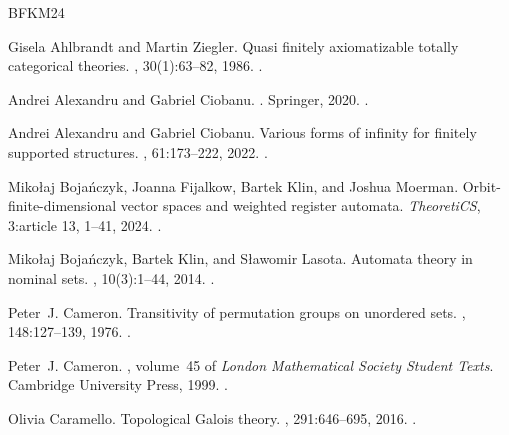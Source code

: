 \documentclass{lmcs}
\begin{document}
\begin{thebibliography}{BFKM24}

Gisela Ahlbrandt and Martin Ziegler.
\newblock Quasi finitely axiomatizable totally categorical theories.
, 30(1):63--82, 1986.
\newblock \href {https://doi.org/10.1016/0168-0072(86)90037-0}
  {}.

Andrei Alexandru and Gabriel Ciobanu.
.
\newblock Springer, 2020.
\newblock \href {https://doi.org/10.1007/978-3-030-52962-8}
  {}.

Andrei Alexandru and Gabriel Ciobanu.
\newblock Various forms of infinity for finitely supported structures.
, 61:173--222, 2022.
\newblock \href {https://doi.org/10.1007/s00153-021-00787-2}
  {}.

Miko{\l}aj Boja\'nczyk, Joanna Fijalkow, Bartek Klin, and Joshua Moerman. Orbit-finite-dimensional vector spaces and weighted register
 automata. {\em TheoretiCS}, 3:article 13, 1--41, 2024.
\newblock \href {https://doi.org/10.46298/theoretics.24.13}
  {}.

Miko{\l}aj Boja\'nczyk, Bartek Klin, and S{\l}awomir Lasota.
\newblock Automata theory in nominal sets.
, 10(3):1--44, 2014.
\newblock \href {https://doi.org/10.2168/LMCS-10(3:4)2014}
  {}.

Peter~J. Cameron.
\newblock Transitivity of permutation groups on unordered sets.
, 148:127--139, 1976.
\newblock \href {https://doi.org/10.1007/BF01214702}
  {}.

Peter~J. Cameron.
, volume~45 of {\em London Mathematical
  Society Student Texts}.
\newblock Cambridge University Press, 1999.
\newblock \href {https://doi.org/10.1017/CBO9780511623677}
  {}.

Olivia Caramello.
\newblock Topological {G}alois theory.
, 291:646--695, 2016.
\newblock \href {https://doi.org/10.1016/j.aim.2015.11.050}
  {}.


\end{thebibliography}
\end{document}
